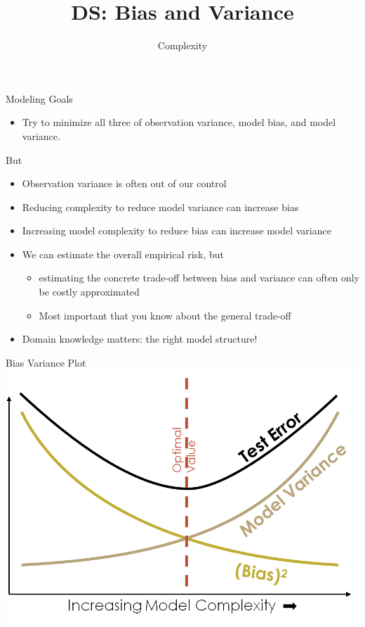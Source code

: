 \documentclass[aspectratio=169]{../latex_main/tntbeamer}  %
\title[Statistics]{DS: Bias and Variance}
\subtitle{Complexity}
\begin{document}
	
	\maketitle
	\begin{frame}[c]{Modeling Goals}
	    \begin{itemize}
	        \item Try to minimize all three of observation variance, model bias, and model variance.
	    \end{itemize}
	    But
	    \begin{itemize}
	        \item Observation variance is often out of our control
	        \item Reducing complexity to reduce model variance can increase bias
	        \item Increasing model complexity to reduce bias can increase model variance
	        \item We can estimate the overall empirical risk, but
	        \begin{itemize}
	           \item estimating the concrete trade-off between bias and variance can often only be costly approximated
	           \item Most important that you know about the general trade-off
	        \end{itemize}
	        \item \alert{Domain knowledge matters:} the right model structure!

	        
	    \end{itemize}
	\end{frame}
	
	
	\begin{frame}{Bias Variance Plot}
	    \centering
	    \includegraphics[scale=.4]{Bild14}
	\end{frame}
	
\end{document}
